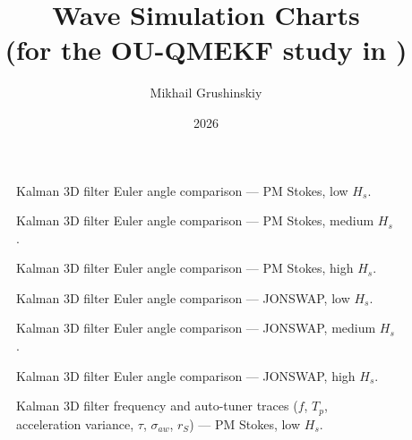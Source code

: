 \documentclass[11pt,letterpaper]{article}
\title{Wave Simulation Charts\\
\large (for the OU-QMEKF study in \cite{Reis2023_DiscreteKalmanHeave,Pascoal2009_KalmanDirectionalSpectrum})}
\author{Mikhail Grushinskiy}
\date{2026}
\begin{document}
    \maketitle



    \begin{figure}[H]\centering
    \resizebox{\textwidth}{!}{}
    \caption{Kalman 3D filter Euler angle comparison — PM Stokes, low $H_s$.}
    \label{fig:w3d_ou3_pmstokes_low}
    \end{figure}

    \begin{figure}[H]\centering
    \resizebox{\textwidth}{!}{}
    \caption{Kalman 3D filter Euler angle comparison — PM Stokes, medium $H_s$.}
    \label{fig:w3d_ou3_pmstokes_medium}
    \end{figure}

    \begin{figure}[H]\centering
    \resizebox{\textwidth}{!}{}
    \caption{Kalman 3D filter Euler angle comparison — PM Stokes, high $H_s$.}
    \label{fig:w3d_ou3_pmstokes_high}
    \end{figure}

    \begin{figure}[H]\centering
    \resizebox{\textwidth}{!}{}
    \caption{Kalman 3D filter Euler angle comparison — JONSWAP, low $H_s$.}
    \label{fig:w3d_ou3_jonswap_low}
    \end{figure}

    \begin{figure}[H]\centering
    \resizebox{\textwidth}{!}{}
    \caption{Kalman 3D filter Euler angle comparison — JONSWAP, medium $H_s$.}
    \label{fig:w3d_ou3_jonswap_medium}
    \end{figure}

    \begin{figure}[H]\centering
    \resizebox{\textwidth}{!}{}
    \caption{Kalman 3D filter Euler angle comparison — JONSWAP, high $H_s$.}
    \label{fig:w3d_ou3_jonswap_high}
    \end{figure}



    \begin{figure}[H]\centering
    \resizebox{\textwidth}{!}{}
    \caption{Kalman 3D filter frequency and auto-tuner traces ($f$, $T_p$, acceleration variance, $\tau$, $\sigma_{aw}$, $r_S$) --- PM Stokes, low $H_s$.}
    \label{fig:w3d_ou3_pmstokes_low_tuner}
    \end{figure}
\end{document}
